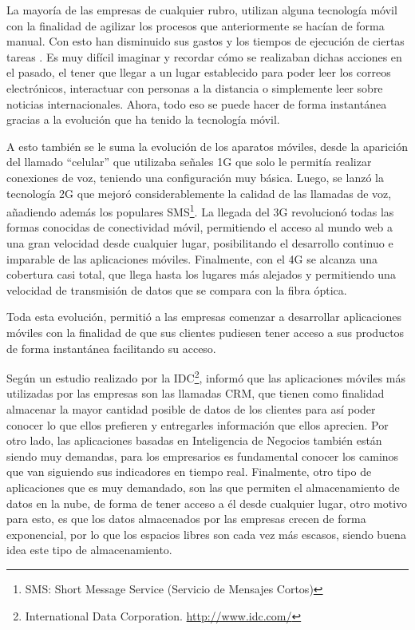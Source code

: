 \documentclass[letter,12pt,oneside]{report}
\begin{document}
La mayoría de las empresas de cualquier rubro, utilizan alguna tecnología móvil con la finalidad de agilizar los procesos que anteriormente se hacían de forma manual. Con esto han disminuido sus gastos y los tiempos de ejecución de ciertas tareas \cite{P1}. Es muy difícil imaginar y recordar cómo se realizaban dichas acciones en el pasado, el tener que llegar a un lugar establecido para poder leer los correos electrónicos, interactuar con personas a la distancia o simplemente leer sobre noticias internacionales. Ahora, todo eso se puede hacer de forma instantánea gracias a la evolución que ha tenido la tecnología móvil.

A esto también se le suma la evolución de los aparatos móviles, desde la aparición del llamado “celular” que utilizaba señales 1G que solo le permitía realizar conexiones de voz, teniendo una configuración muy básica. Luego, se lanzó la tecnología 2G que mejoró considerablemente la calidad de las llamadas de voz, añadiendo además los populares SMS\footnote{SMS: Short Message Service (Servicio de Mensajes Cortos)}. La llegada del 3G revolucionó todas las formas conocidas de conectividad móvil, permitiendo el acceso al mundo web a una gran velocidad desde cualquier lugar, posibilitando el desarrollo continuo e imparable de las aplicaciones móviles. Finalmente, con el 4G se alcanza una cobertura casi total, que llega hasta los lugares más alejados y permitiendo una velocidad de transmisión de datos que se compara con la fibra óptica.

Toda esta evolución, permitió a las empresas comenzar a desarrollar aplicaciones móviles con la finalidad de que sus clientes pudiesen tener acceso a sus productos de forma instantánea facilitando su acceso.

Según un estudio realizado por la IDC\footnote{International Data Corporation. \url{http://www.idc.com/}}\cite{U2}, informó que las aplicaciones móviles más utilizadas por las empresas son las llamadas CRM, que tienen como finalidad almacenar la mayor cantidad posible de datos de los clientes para así poder conocer lo que ellos prefieren y entregarles información que ellos aprecien. Por otro lado, las aplicaciones basadas en Inteligencia de Negocios también están siendo muy demandas, para los empresarios es fundamental conocer los caminos que van siguiendo sus indicadores en tiempo real. Finalmente, otro tipo de aplicaciones que es muy demandado, son las que permiten el almacenamiento de datos en la nube, de forma de tener acceso a él desde cualquier lugar, otro motivo para esto, es que los datos almacenados por las empresas crecen de forma exponencial, por lo que los espacios libres son cada vez más escasos, siendo buena idea este tipo de almacenamiento.
\end{document}
